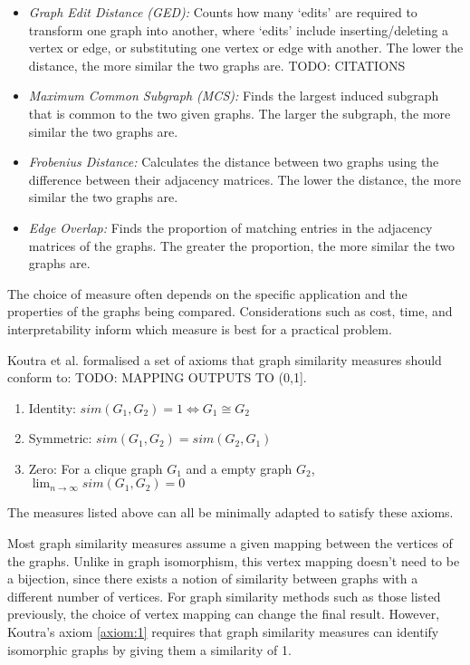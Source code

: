 \begin{itemize}
    \item \textit{Graph Edit Distance (GED):} Counts how many `edits' are required to transform one graph into another, where `edits' include inserting/deleting a vertex or edge, or substituting one vertex or edge with another. The lower the distance, the more similar the two graphs are. TODO: CITATIONS
    \item \textit{Maximum Common Subgraph (MCS):} Finds the largest induced subgraph that is common to the two given graphs. The larger the subgraph, the more similar the two graphs are.
    \item \textit{Frobenius Distance:} Calculates the distance between two graphs using the difference between their adjacency matrices. The lower the distance, the more similar the two graphs are.
    \item \textit{Edge Overlap:} Finds the proportion of matching entries in the adjacency matrices of the graphs. The greater the proportion, the more similar the two graphs are.\cite{QAOA_graph_sim}
\end{itemize}

The choice of measure often depends on the specific application and the properties of the graphs being compared. Considerations such as cost, time, and interpretability inform which measure is best for a practical problem.

Koutra et al. \cite{deltacon} formalised a set of axioms that graph similarity measures should conform to: TODO: MAPPING OUTPUTS TO (0,1].
\begin{enumerate}
    \item Identity: $sim(G_{1},G_{2})=1 \iff G_{1} \cong G_{2}$ \label{axiom:1}
    \item Symmetric:  $sim(G_{1},G_{2})=sim(G_{2},G_{1})$ \label{axiom:2}
    \item Zero: For a clique graph $G_{1}$ and a empty graph $G_{2}$, 
    $\lim_{n \to \infty} sim(G_{1},G_{2}) = 0$ \label{axiom:3}
\end{enumerate}

The measures listed above can all be minimally adapted to satisfy these axioms.

Most graph similarity measures assume a given mapping between the vertices of the graphs. Unlike in graph isomorphism, this vertex mapping doesn't need to be a bijection, since there exists a notion of similarity between graphs with a different number of vertices. For graph similarity methods such as those listed previously, the choice of vertex mapping can change the final result. However, Koutra's axiom \ref{axiom:1} requires that graph similarity measures can identify isomorphic graphs by giving them a similarity of 1.

